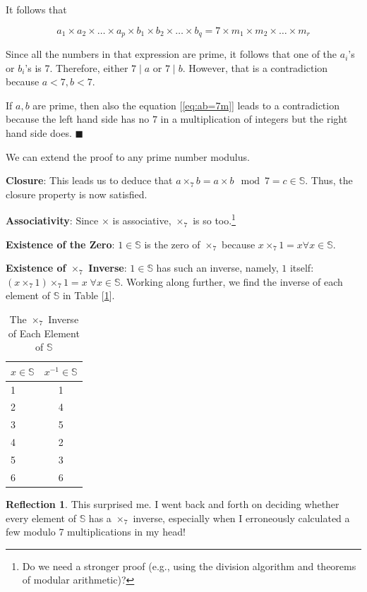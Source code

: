 \documentclass[english,notitlepage,smartquotes]{hgbreport}
\theoremstyle{definition}
\theoremstyle{definition}
\theoremstyle{remark}
\theoremstyle{definition}
\theoremstyle{plain}
\renewcommand\qedsymbol{$\blacksquare$}
\theoremstyle{definition}
\newtheorem{reflection}{Reflection}
\begin{document}
\begin{enumerate}
It follows that 

\begin{equation}\label{eq:ab=7m}
a_1\times a_2\times\dots\times a_p\times b_1\times b_2\times\dots\times b_q=7\times m_1\times m_2\times\dots\times m_r
\end{equation}

Since all the numbers in that expression are prime, it follows that one of the $a_i$'s or $b_i$'s is 7. Therefore, either $7\mid a$ or $7\mid b$. However, that is a contradiction because $a<7,b<7$.

If $a,b$ are prime, then also the equation [\ref{eq:ab=7m}] leads to a contradiction because the left hand side has no $7$ in a multiplication of integers but the right hand side does.
\qedsymbol

We can extend the proof to any prime number modulus. 

\textbf{Closure}: This leads us to deduce that $a\times_7 b=a\times b\mod 7=c\in\mathbb{S}$. Thus, the closure property is now satisfied. 

\textbf{Associativity}: Since $\times$ is associative, $\times_7$ is so too.\footnote{Do we need a stronger proof (e.g., using the division algorithm and theorems of modular arithmetic)?}

\textbf{Existence of the Zero}: $1\in\mathbb{S}$ is the zero of $\times_7$ because $x\times_7 1=x\forall x\in\mathbb{S}$. 

\textbf{Existence of $\times_7$ Inverse}: $1\in\mathbb{S}$ has such an inverse, namely, $1$ itself: $(x\times_7 1)\times_7 1=x\;\forall x\in\mathbb{S}$. Working along further, we find the inverse of each element of $\mathbb{S}$ in Table [\ref{tab:mod7inv}]. 


\begin{table}[h!]
\centering
\begin{tabular}{l|c}
$x\in\mathbb{S}$&$x^{-1}\in\mathbb{S}$\\
\hline
1&1\\
2&4\\
3&5\\
4&2\\
5&3\\
6&6
\end{tabular}
\caption{The $\times_7$ Inverse of Each Element of $\mathbb{S}$}
\label{tab:mod7inv}
\end{table}

\begin{reflection}
This surprised me. I went back and forth on deciding whether every element of $\mathbb{S}$ has a $\times_7$ inverse, especially when I erroneously calculated a few modulo 7 multiplications in my head! 


\end{reflection}
\end{enumerate}
\end{document}

